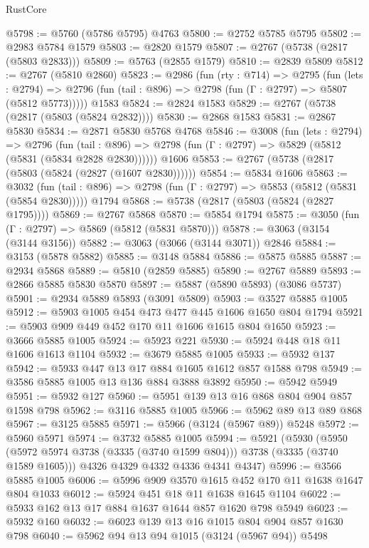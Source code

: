 \begin{lexlean}{RustCore}
\begin{coremodule}
@5798 := @5760 (@5786 @5795) @4763
@5800 := @2752 @5785 @5795
@5802 := @2983 @5784 @1579
@5803 := @2820 @1579
@5807 := @2767 (@5738 (@2817 (@5803 @2833)))
@5809 := @5763 (@2855 @1579)
@5810 := @2839 @5809
@5812 := @2767 (@5810 @2860)
@5823 := @2986
    (fun (rty : @714) =>
    @2795
      (fun (lets : @2794) =>
      @2796 (fun (tail : @896) => @2798 (fun (Γ : @2797) => @5807 (@5812 @5773)))))
    @1583
@5824 := @2824 @1583
@5829 := @2767 (@5738 (@2817 (@5803 (@5824 @2832))))
@5830 := @2868 @1583
@5831 := @2867 @5830
@5834 := @2871 @5830 @5768 @4768
@5846 := @3008
    (fun (lets : @2794) =>
    @2796
      (fun (tail : @896) => @2798 (fun (Γ : @2797) => @5829 (@5812 (@5831 (@5834 @2828 @2830))))))
    @1606
@5853 := @2767 (@5738 (@2817 (@5803 (@5824 (@2827 (@1607 @2830))))))
@5854 := @5834 @1606
@5863 := @3032
    (fun (tail : @896) => @2798 (fun (Γ : @2797) => @5853 (@5812 (@5831 (@5854 @2830)))))
    @1794
@5868 := @5738 (@2817 (@5803 (@5824 (@2827 @1795))))
@5869 := @2767 @5868
@5870 := @5854 @1794
@5875 := @3050 (fun (Γ : @2797) => @5869 (@5812 (@5831 @5870)))
@5878 := @3063 (@3154 (@3144 @3156))
@5882 := @3063 (@3066 (@3144 @3071)) @2846
@5884 := @3153 (@5878 @5882)
@5885 := @3148 @5884
@5886 := @5875 @5885
@5887 := @2934 @5868
@5889 := @5810 (@2859 @5885)
@5890 := @2767 @5889
@5893 := @2866 @5885 @5830 @5870
@5897 := @5887 (@5890 @5893) (@3086 @5737)
@5901 := @2934 @5889 @5893 (@3091 @5809)
@5903 := @3527 @5885 @1005
@5912 := @5903 @1005 @454 @473 @477 @445 @1606 @1650 @804 @1794
@5921 := @5903 @909 @449 @452 @170 @11 @1606 @1615 @804 @1650
@5923 := @3666 @5885 @1005
@5924 := @5923 @221
@5930 := @5924 @448 @18 @11 @1606 @1613 @1104
@5932 := @3679 @5885 @1005
@5933 := @5932 @137
@5942 := @5933 @447 @13 @17 @884 @1605 @1612 @857 @1588 @798
@5949 := @3586 @5885 @1005 @13 @136 @884 @3888 @3892
@5950 := @5942 @5949
@5951 := @5932 @127
@5960 := @5951 @139 @13 @16 @868 @804 @904 @857 @1598 @798
@5962 := @3116 @5885 @1005
@5966 := @5962 @89 @13 @89 @868
@5967 := @3125 @5885
@5971 := @5966 (@3124 (@5967 @89)) @5248
@5972 := @5960 @5971
@5974 := @3732 @5885 @1005
@5994 := @5921
    (@5930
      (@5950 (@5972 @5974 @3738 (@3335 (@3740 @1599 @804))) @3738 (@3335 (@3740 @1589 @1605)))
      @4326
      @4329
      @4332
      @4336
      @4341
      @4347)
@5996 := @3566 @5885 @1005
@6006 := @5996 @909 @3570 @1615 @452 @170 @11 @1638 @1647 @804 @1033
@6012 := @5924 @451 @18 @11 @1638 @1645 @1104
@6022 := @5933 @162 @13 @17 @884 @1637 @1644 @857 @1620 @798 @5949
@6023 := @5932 @160
@6032 := @6023 @139 @13 @16 @1015 @804 @904 @857 @1630 @798
@6040 := @5962 @94 @13 @94 @1015 (@3124 (@5967 @94)) @5498

\end{coremodule}
\end{lexlean}
